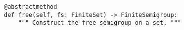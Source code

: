 \par\begin{minipage}{60ex}
\begin{verbatim}
@abstractmethod
def free(self, fs: FiniteSet) -> FiniteSemigroup:
    """ Construct the free semigroup on a set. """
\end{verbatim}
\end{minipage}\par